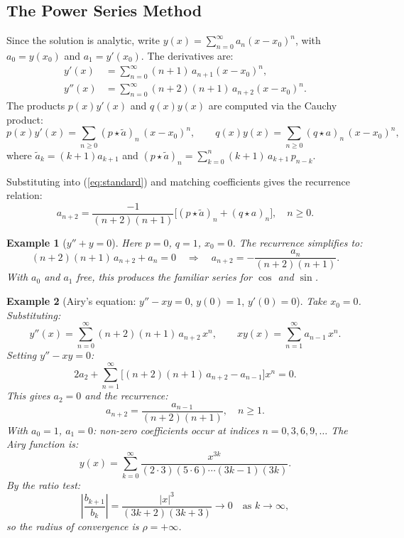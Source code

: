\documentclass{article}
\newtheorem*{example}{Example}
\newcommand{\conv}{\star}
\begin{document}
\subsection{The Power Series Method}

Since the solution is analytic, write $y(x) = \sum_{n=0}^\infty a_n(x-x_0)^n$, with $a_0 = y(x_0)$ and $a_1 = y'(x_0)$. The derivatives are:
\begin{align*}
    y'(x) &= \sum_{n=0}^\infty (n+1)\,a_{n+1}(x-x_0)^n, \\
    y''(x) &= \sum_{n=0}^\infty (n+2)(n+1)\,a_{n+2}(x-x_0)^n.
\end{align*}
The products $p(x)y'(x)$ and $q(x)y(x)$ are computed via the Cauchy product:
\[p(x)y'(x) = \sum_{n\geq 0}(p\conv\tilde{a})_n\,(x-x_0)^n,\qquad q(x)y(x) = \sum_{n\geq 0}(q\conv a)_n\,(x-x_0)^n,\]
where $\tilde{a}_k = (k+1)a_{k+1}$ and $(p\conv\tilde{a})_n = \sum_{k=0}^n (k+1)\,a_{k+1}\,p_{n-k}$.

Substituting into (\ref{eq:standard}) and matching coefficients gives the recurrence relation:
\[\boxed{a_{n+2} = \frac{-1}{(n+2)(n+1)}\Big[(p\conv\tilde{a})_n + (q\conv a)_n\Big],\quad n\geq 0.}\]

\begin{example}[$y'' + y = 0$]
    Here $p = 0$, $q = 1$, $x_0 = 0$. The recurrence simplifies to:
    \[(n+2)(n+1)\,a_{n+2} + a_n = 0 \quad\Longrightarrow\quad a_{n+2} = -\frac{a_n}{(n+2)(n+1)}.\]
    With $a_0$ and $a_1$ free, this produces the familiar series for $\cos$ and $\sin$.
\end{example}

\begin{example}[Airy's equation: $y'' - xy = 0$, $y(0) = 1$, $y'(0) = 0$]
    Take $x_0 = 0$. Substituting:
    \[y''(x) = \sum_{n=0}^\infty (n+2)(n+1)\,a_{n+2}\,x^n,\qquad xy(x) = \sum_{n=1}^\infty a_{n-1}\,x^n.\]
    Setting $y'' - xy = 0$:
    \[2a_2 + \sum_{n=1}^\infty \Big[(n+2)(n+1)\,a_{n+2} - a_{n-1}\Big]x^n = 0.\]
    This gives $a_2 = 0$ and the recurrence:
    \[a_{n+2} = \frac{a_{n-1}}{(n+2)(n+1)},\quad n\geq 1.\]
    With $a_0 = 1$, $a_1 = 0$: non-zero coefficients occur at indices $n = 0, 3, 6, 9, \ldots$ The Airy function is:
    \[y(x) = \sum_{k=0}^\infty \frac{x^{3k}}{(2\cdot 3)(5\cdot 6)\cdots(3k-1)(3k)}.\]
    By the ratio test:
    \[\left|\frac{b_{k+1}}{b_k}\right| = \frac{|x|^3}{(3k+2)(3k+3)} \to 0 \quad\text{as } k\to\infty,\]
    so the radius of convergence is $\rho = +\infty$.
\end{example}
\end{document}
